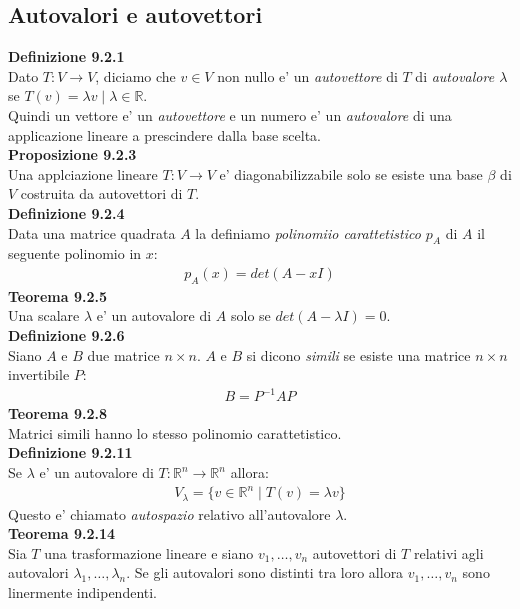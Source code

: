 \documentclass{article}
\begin{document}
\subsection{Autovalori e autovettori}
\textbf{Definizione 9.2.1}
\\ Dato $T: V \to V$, diciamo che $v \in V$ non nullo e' un \textit{autovettore} di $T$ di \textit{autovalore $\lambda$} se $T(v)=\lambda v \mid \lambda \in \mathbb{R}$.   \\
Quindi un vettore e' un \textit{autovettore} e un numero e' un \textit{autovalore} di una applicazione lineare a prescindere dalla base scelta. \\
\textbf{Proposizione 9.2.3}
\\ Una applciazione lineare $T : V \to V$ e' diagonabilizzabile solo se esiste una base $\beta$ di $V$ costruita da autovettori di $T$. \\
\textbf{Definizione 9.2.4}
\\ Data una matrice quadrata $A$ la definiamo \textit{polinomiio carattetistico $p_A$ } di $A$ il seguente polinomio in $x$:
\begin{align*}
  p_A(x)=det(A-xI)
\end{align*}
\textbf{Teorema 9.2.5} 
\\ Una scalare $\lambda$ e' un autovalore di $A$ solo se $det(A-\lambda I)=0$. \\
\textbf{Definizione 9.2.6}
\\ Siano $A$ e $B$ due matrice $n\times n$. $A$ e $B$ si dicono \textit{simili} se esiste una matrice $n\times n$ invertibile $P$:
\begin{align*}
  B=P^{-1}AP
\end{align*}
\textbf{Teorema 9.2.8}
\\ Matrici simili hanno lo stesso polinomio carattetistico. \\
\textbf{Definizione 9.2.11}
\\ Se $\lambda$ e' un autovalore di $T : \mathbb{R}^n \to \mathbb{R}^n$ allora:
\begin{align*}
  V_\lambda=\{v\in \mathbb{R}^n \mid T(v)=\lambda v\}
\end{align*}
Questo e' chiamato \textit{autospazio} relativo all'autovalore $\lambda$.
\vspace{1em}
 \\
\textbf{Teorema 9.2.14}
\\ Sia $T$ una trasformazione lineare e siano $v_1,\dots,v_n$ autovettori di $T$ relativi agli autovalori $\lambda_1,\dots,\lambda_n$. Se gli autovalori sono distinti tra loro allora $v_1,\dots,v_n$ sono linermente indipendenti. \\
\end{document}
